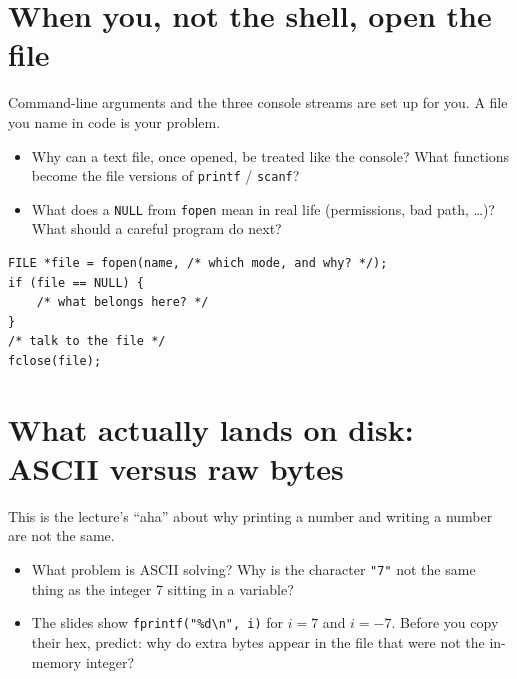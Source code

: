 \documentclass[12pt]{article}
\begin{document}
\vspace{1.2em}

\section{When you, not the shell, open the file}

Command-line arguments and the three console streams are set up for you. A file you name in code is your problem.

\begin{itemize}
  \item Why can a text file, once opened, be treated like the console? What functions become the file versions of \texttt{printf} / \texttt{scanf}?
  \vspace{2.2em}
  \item What does a \texttt{NULL} from \texttt{fopen} mean in real life (permissions, bad path, \ldots)? What should a careful program do next?
  \vspace{2.4em}
\end{itemize}

\begin{lstlisting}
FILE *file = fopen(name, /* which mode, and why? */);
if (file == NULL) {
    /* what belongs here? */
}
/* talk to the file */
fclose(file);
\end{lstlisting}

\vspace{1.8em}

\section{What actually lands on disk: ASCII versus raw bytes}

This is the lecture's ``aha'' about why printing a number and writing a number are not the same.

\begin{itemize}
  \item What problem is ASCII solving? Why is the character \texttt{"7"} not the same thing as the integer 7 sitting in a variable?
  \vspace{2.4em}
  \item The slides show \texttt{fprintf("\%d\textbackslash n", i)} for $i = 7$ and $i = -7$. Before you copy their hex, predict: why do extra bytes appear in the file that were not the in-memory integer?
  \vspace{2.4em}
\end{itemize}
\end{document}
